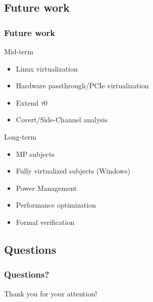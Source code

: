 \documentclass[xcolor={dvipsnames}]{beamer}
\begin{document}
\subsection{Future work}
\begin{frame}\frametitle{Future work}
\begin{block}{Mid-term}
	\begin{itemize}
		\item Linux virtualization
		\item Hardware passthrough/PCIe virtualization
		\item Extend $\tau$0
		\item Covert/Side-Channel analysis
	\end{itemize}
\end{block}
\begin{block}{Long-term}
	\begin{itemize}
		\item MP subjects
		\item Fully virtualized subjects (Windows)
		\item Power Management
		\item Performance optimization
		\item Formal verification
	\end{itemize}
\end{block}
\end{frame}

\subsection{Questions}
\begin{frame}\frametitle{Questions?}
\begin{center}
	Thank you for your attention!
\end{center}
\end{frame}
\end{document}
